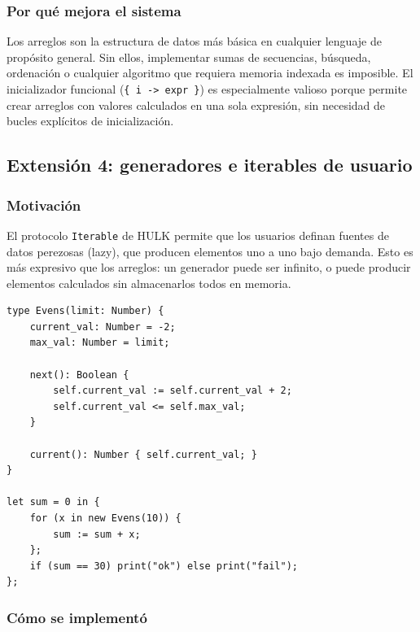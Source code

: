 \documentclass[12pt,letterpaper]{article}
\newcommand{\hulk}{\textsc{HULK}}
\newcommand{\src}[1]{\texttt{#1}}
\begin{document}
\subsubsection{Por qué mejora el sistema}

Los arreglos son la estructura de datos más básica en cualquier lenguaje de propósito general. Sin ellos, implementar sumas de secuencias, búsqueda, ordenación o cualquier algoritmo que requiera memoria indexada es imposible. El inicializador funcional (\src{\{ i -> expr \}}) es especialmente valioso porque permite crear arreglos con valores calculados en una sola expresión, sin necesidad de bucles explícitos de inicialización.

\subsection{Extensión 4: generadores e iterables de usuario}

\subsubsection{Motivación}

El protocolo \src{Iterable} de \hulk{} permite que los usuarios definan fuentes de datos perezosas (lazy), que producen elementos uno a uno bajo demanda. Esto es más expresivo que los arreglos: un generador puede ser infinito, o puede producir elementos calculados sin almacenarlos todos en memoria.

\begin{lstlisting}[language=HULK,caption={Generador de números pares como tipo usuario}]
type Evens(limit: Number) {
    current_val: Number = -2;
    max_val: Number = limit;

    next(): Boolean {
        self.current_val := self.current_val + 2;
        self.current_val <= self.max_val;
    }

    current(): Number { self.current_val; }
}

let sum = 0 in {
    for (x in new Evens(10)) {
        sum := sum + x;
    };
    if (sum == 30) print("ok") else print("fail");
};
\end{lstlisting}

\subsubsection{Cómo se implementó}
\end{document}
